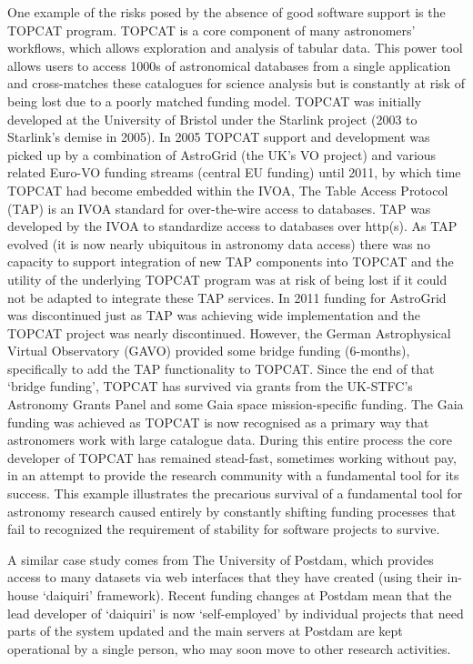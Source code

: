 \documentclass[11pt]{article}
\begin{document}
One example of the risks posed by the absence of good software support is the TOPCAT program.  
TOPCAT is a core component of many astronomers' workflows, which allows exploration and analysis of tabular data.  
This power tool allows users to access 1000s of astronomical databases from a single application and cross-matches these catalogues for science analysis but is constantly at risk of being lost due to a poorly matched funding model.
TOPCAT was initially developed at the University of Bristol under the Starlink project
(2003 to Starlink's demise in 2005).
In 2005 TOPCAT support and development was picked up by a combination of AstroGrid (the UK's VO project) and various related Euro-VO funding streams (central EU funding) until 2011, by which time TOPCAT had become embedded within the IVOA,
The Table Access Protocol (TAP) is an IVOA standard for over-the-wire access to databases. 
TAP was developed by the IVOA to standardize access to databases over http(s).  
As TAP evolved (it is now nearly ubiquitous in astronomy data access) there was no capacity to support integration of new TAP components into TOPCAT and the utility of the underlying TOPCAT program was at risk of being lost if it could not be adapted to integrate these TAP services.
In 2011 funding for AstroGrid was discontinued just as TAP was achieving wide implementation and the TOPCAT project was nearly discontinued. 
However, the German Astrophysical Virtual Observatory (GAVO) provided some bridge funding (6-months), specifically to add the TAP functionality to TOPCAT.
Since the end of that `bridge funding', TOPCAT has survived via
grants from the UK-STFC's Astronomy Grants Panel and 
some Gaia space mission-specific funding.
The Gaia funding was achieved as TOPCAT is now recognised as a primary way that astronomers work with large catalogue data.
During this entire process the core developer of TOPCAT has remained stead-fast, sometimes working without pay, in an attempt to provide the research community with a fundamental tool for its success. 
This example illustrates the precarious survival of a fundamental tool for astronomy research caused entirely by constantly shifting funding processes that fail to recognized the requirement of stability for software projects to survive.

A similar case study comes from The University of Postdam, which provides access to many datasets via web interfaces that they have created (using their in-house  `daiquiri' framework).  Recent funding changes at Postdam mean that the lead developer of `daiquiri' is now `self-employed' by individual projects that need parts of the system updated and the main servers at Postdam are kept operational by a single person, who may soon move to other research activities.  
\end{document}
